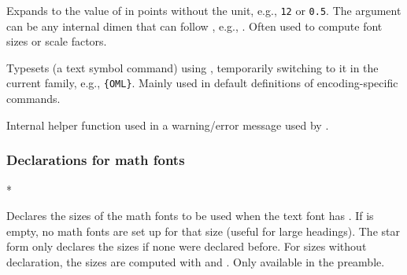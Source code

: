 \documentclass{l3in2edoc}
\begin{document}
\begin{function}[EXP]
  {
    \strip@pt
  }
  \begin{syntax}
     
  \end{syntax}
  Expands to the value of  in points without the
  unit, e.g., \texttt{12} or \texttt{0.5}. The argument can be any
  internal dimen that can follow , e.g., 
  . Often used to compute font sizes or
  scale factors.
\end{function}


\begin{function}[user]
  {
    \UseTextSymbol
  }
  \begin{syntax}
      
  \end{syntax}
  Typesets  (a text symbol command) using
  , temporarily switching to it in the current family,
  e.g., \texttt{\{OML\}}. Mainly used
  in default definitions of encoding-specific commands.
\end{function}



\begin{function}[int]
  {
    \@wrong@font@char
  }
  Internal helper function used in a warning/error message used by .
\end{function}



\subsubsection{Declarations for math fonts}



\begin{function}[user]
  {
    \DeclareMathSizes
  }
  \begin{syntax}
     *    
  \end{syntax}
  Declares the sizes of the math fonts to be used when the text font
  has . If  is empty, no math
  fonts are set up for that size (useful for large headings). The
  star form only declares the sizes if none were declared before. For
  sizes without declaration, the sizes are computed with
   and . Only
  available in the preamble.
\end{function}
\end{document}
